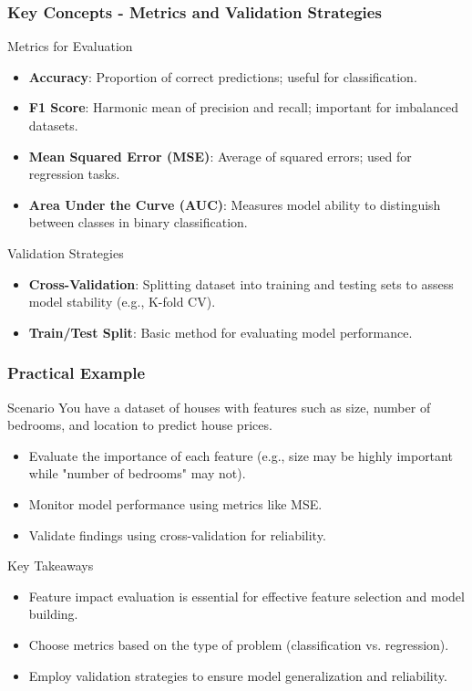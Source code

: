 \documentclass[aspectratio=169]{beamer}
\begin{document}
\begin{frame}[fragile]
    \frametitle{Key Concepts - Metrics and Validation Strategies}
    \begin{block}{Metrics for Evaluation}
        \begin{itemize}
            \item \textbf{Accuracy}: Proportion of correct predictions; useful for classification.
            \item \textbf{F1 Score}: Harmonic mean of precision and recall; important for imbalanced datasets.
            \item \textbf{Mean Squared Error (MSE)}: Average of squared errors; used for regression tasks.
            \item \textbf{Area Under the Curve (AUC)}: Measures model ability to distinguish between classes in binary classification.
        \end{itemize}
    \end{block}

    \begin{block}{Validation Strategies}
        \begin{itemize}
            \item \textbf{Cross-Validation}: Splitting dataset into training and testing sets to assess model stability (e.g., K-fold CV).
            \item \textbf{Train/Test Split}: Basic method for evaluating model performance.
        \end{itemize}
    \end{block}
\end{frame}

\begin{frame}[fragile]
    \frametitle{Practical Example}
    \begin{block}{Scenario}
        You have a dataset of houses with features such as size, number of bedrooms, and location to predict house prices.
        \begin{itemize}
            \item Evaluate the importance of each feature (e.g., size may be highly important while "number of bedrooms" may not).
            \item Monitor model performance using metrics like MSE.
            \item Validate findings using cross-validation for reliability.
        \end{itemize}
    \end{block}
    
    \begin{block}{Key Takeaways}
        \begin{itemize}
            \item Feature impact evaluation is essential for effective feature selection and model building.
            \item Choose metrics based on the type of problem (classification vs. regression).
            \item Employ validation strategies to ensure model generalization and reliability.
        \end{itemize}
    \end{block}
\end{frame}
\end{document}
